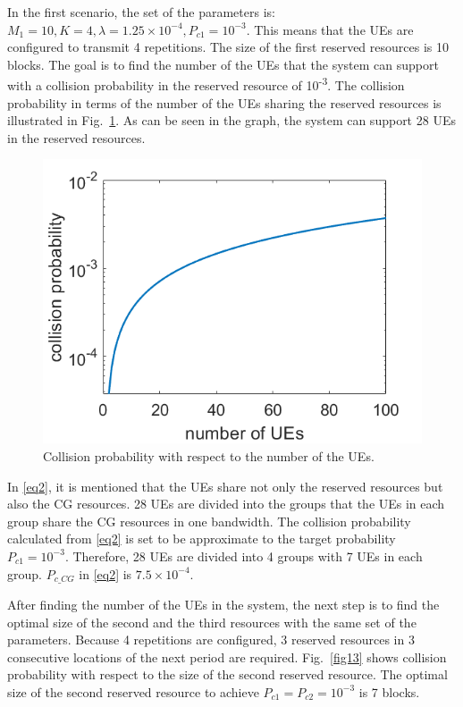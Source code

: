 \documentclass{ieeeaccess}
\begin{document}
In the first scenario, the set of the parameters is: $M_1=10, K=4, \lambda=1.25\times10^{-4}, P_{c1}=10^{-3}$. This means that the UEs are configured to transmit 4 repetitions. The size of the first reserved resources is 10 blocks. The goal is to find the number of the UEs that the system can support with a collision probability in the reserved resource of 10\textsuperscript{-3}. The collision probability in terms of the number of the UEs sharing the reserved resources is illustrated in Fig.~\ref{fig12}. As can be seen in the graph, the system can support 28 UEs in the reserved resources.

\begin{figure}[htbp]
\centerline{\includegraphics[scale=0.35]{fig12.png}}
\caption{Collision probability with respect to the number of the UEs.}
\vspace{-2mm}
\label{fig12}

\end{figure}


In \eqref{eq2}, it is mentioned that the UEs share not only the reserved resources but also the CG resources. 28 UEs are divided into the groups that the UEs in each group share the CG resources in one bandwidth. The collision probability calculated from \eqref{eq2} is set to be approximate to the target probability $P_{c1}=10^{-3}$. Therefore, 28 UEs are divided into 4 groups with 7 UEs in each group. $P_{c\_CG}$ in \eqref{eq2} is $7.5\times10^{-4}$.


After finding the number of the UEs in the system, the next step is to find the optimal size of the second and the third resources with the same set of the parameters. Because 4 repetitions are configured, 3 reserved resources in 3 consecutive locations of the next period are required. Fig.~\ref{fig13} shows collision probability with respect to the size of the second reserved resource. The optimal size of the second reserved resource to achieve $P_{c1} = P_{c2} = 10^{-3}$ is 7 blocks.
\end{document}
